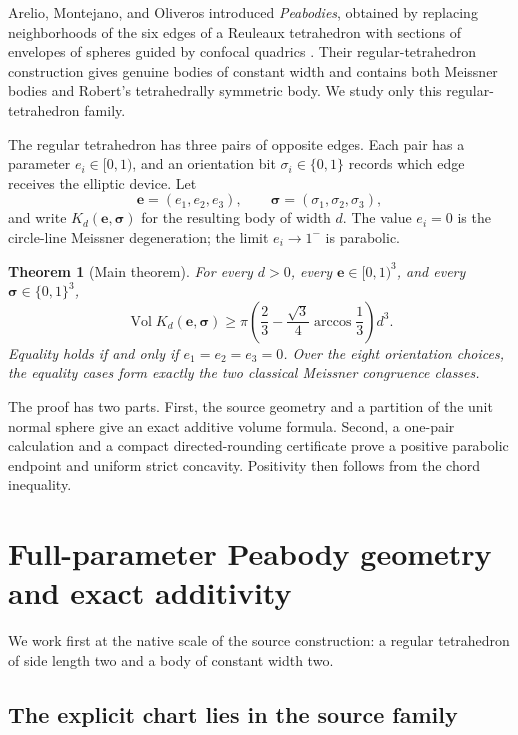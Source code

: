 \documentclass[11pt]{article}
\numberwithin{equation}{section}
\newtheorem{theorem}{Theorem}[section]
\theoremstyle{remark}
\newcommand{\Vol}{\operatorname{Vol}}
\begin{document}
Arelio, Montejano, and Oliveros introduced \emph{Peabodies}, obtained by replacing neighborhoods of the six edges of a Reuleaux tetrahedron with sections of envelopes of spheres guided by confocal quadrics \cite{ArelioMontejanoOliveros2023}.  Their regular-tetrahedron construction gives genuine bodies of constant width and contains both Meissner bodies and Robert's tetrahedrally symmetric body.  We study only this regular-tetrahedron family.

The regular tetrahedron has three pairs of opposite edges.  Each pair has a parameter \(e_i\in[0,1)\), and an orientation bit \(\sigma_i\in\{0,1\}\) records which edge receives the elliptic device.  Let
\[
  \mathbf e=(e_1,e_2,e_3),\qquad
  \boldsymbol\sigma=(\sigma_1,\sigma_2,\sigma_3),
\]
and write \(K_d(\mathbf e,\boldsymbol\sigma)\) for the resulting body of width \(d\).  The value \(e_i=0\) is the circle-line Meissner degeneration; the limit \(e_i\to1^-\) is parabolic.

\begin{theorem}[Main theorem]
\label{thm:main}
For every \(d>0\), every \(\mathbf e\in[0,1)^3\), and every \(\boldsymbol\sigma\in\{0,1\}^3\),
\begin{equation}
  \Vol K_d(\mathbf e,\boldsymbol\sigma)
  \ge
  \pi\left(\frac23-\frac{\sqrt3}{4}\arccos\frac13\right)d^3.
  \label{eq:main}
\end{equation}
Equality holds if and only if \(e_1=e_2=e_3=0\).  Over the eight orientation choices, the equality cases form exactly the two classical Meissner congruence classes.
\end{theorem}

The proof has two parts.  First, the source geometry and a partition of the unit normal sphere give an exact additive volume formula.  Second, a one-pair calculation and a compact directed-rounding certificate prove a positive parabolic endpoint and uniform strict concavity.  Positivity then follows from the chord inequality.

\section{Full-parameter Peabody geometry and exact additivity}
\label{sec:additivity}

We work first at the native scale of the source construction: a regular tetrahedron of side length two and a body of constant width two.

\subsection{The explicit chart lies in the source family}
\end{document}

